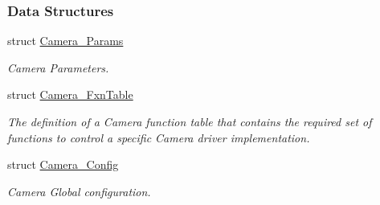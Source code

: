 \subsubsection*{Data Structures}
\begin{DoxyCompactItemize}
\item 
struct \hyperlink{struct_camera___params}{Camera\+\_\+\+Params}
\begin{DoxyCompactList}\small\item\em Camera Parameters. \end{DoxyCompactList}\item 
struct \hyperlink{struct_camera___fxn_table}{Camera\+\_\+\+Fxn\+Table}
\begin{DoxyCompactList}\small\item\em The definition of a Camera function table that contains the required set of functions to control a specific Camera driver implementation. \end{DoxyCompactList}\item 
struct \hyperlink{struct_camera___config}{Camera\+\_\+\+Config}
\begin{DoxyCompactList}\small\item\em Camera Global configuration. \end{DoxyCompactList}\end{DoxyCompactItemize}
